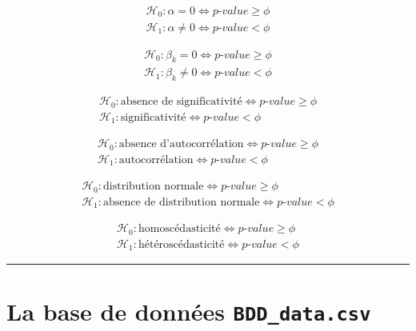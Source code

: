\documentclass[
  11pt,
  french,
]{article}
\begin{document}
\[\begin{array}{c}
\mathcal{H}_{0}:\alpha=0 \iff p\text{-}value \geqslant \phi\\
\mathcal{H}_{1}:\alpha\not=0 \iff p\text{-}value < \phi
\end{array}\]

\[\begin{array}{c}
\mathcal{H}_{0}:\beta_{k}=0 \iff p\text{-}value \geqslant \phi\\
\mathcal{H}_{1}:\beta_{k}\not=0 \iff p\text{-}value < \phi
\end{array}\]

\[\begin{array}{c}
\mathcal{H}_{0}:\text{absence de significativité} \iff p\text{-}value \geqslant \phi\\
\mathcal{H}_{1}:\text{significativité} \iff p\text{-}value < \phi
\end{array}\]

\[\begin{array}{c}
\mathcal{H}_{0}:\text{absence d'autocorrélation} \iff p\text{-}value \geqslant \phi\\
\mathcal{H}_{1}:\text{autocorrélation} \iff p\text{-}value < \phi
\end{array}\]

\[\begin{array}{c}
\mathcal{H}_{0}:\text{distribution normale} \iff p\text{-}value \geqslant \phi\\
\mathcal{H}_{1}:\text{absence de distribution normale} \iff p\text{-}value < \phi
\end{array}\]

\[\begin{array}{c}
\mathcal{H}_{0}:\text{homoscédasticité} \iff p\text{-}value \geqslant \phi\\
\mathcal{H}_{1}:\text{hétéroscédasticité} \iff p\text{-}value < \phi
\end{array}\]

\begin{center}\rule{0.5\linewidth}{0.5pt}\end{center}

\newpage

\hypertarget{la-base-de-donnuxe9es-bdd_data.csv}{%
\section{\texorpdfstring{La base de données
\texttt{BDD\_data.csv}}{La base de données BDD\_data.csv}}\label{la-base-de-donnuxe9es-bdd_data.csv}}
\end{document}

